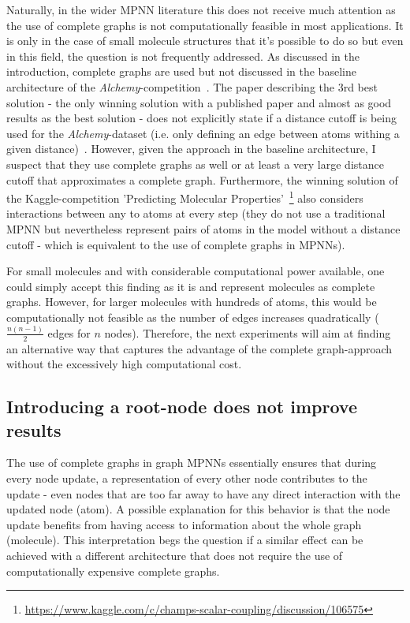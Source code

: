 Naturally, in the wider MPNN literature this does not receive much attention as the use of complete graphs is not computationally feasible in most applications. It is only in the case of small molecule structures that it's possible to do so but even in this field, the question is not frequently addressed. As discussed in the introduction, complete graphs are used but not discussed in the baseline architecture of the \textit{Alchemy}-competition~\cite{Chen2019}. The paper describing the 3rd best solution - the only winning solution with a published paper and almost as good results as the best solution - does not explicitly state if a distance cutoff is being used for the \textit{Alchemy}-dataset (i.e. only defining an edge between atoms withing a given distance)~\cite{Klicpera2019}. However, given the approach in the baseline architecture, I suspect that they use complete graphs as well or at least a very large distance cutoff that approximates a complete graph. Furthermore, the winning solution of the Kaggle-competition 'Predicting Molecular Properties'~\footnote{\url{https://www.kaggle.com/c/champs-scalar-coupling/discussion/106575}} also considers interactions between any to atoms at every step (they do not use a traditional MPNN but nevertheless represent pairs of atoms in the model without a distance cutoff - which is equivalent to the use of complete graphs in MPNNs).

For small molecules and with considerable computational power available, one could simply accept this finding as it is and represent molecules as complete graphs. However, for larger molecules with hundreds of atoms, this would be computationally not feasible as the number of edges increases quadratically ($\frac{n(n - 1)}{2}$ edges for $n$ nodes). Therefore, the next experiments will aim at finding an alternative way that captures the advantage of the complete graph-approach without the excessively high computational cost.





\subsection{Introducing a root-node does not improve results}
\label{sec:root-node}


The use of complete graphs in graph MPNNs essentially ensures that during every node update, a representation of every other node contributes to the update - even nodes that are too far away to have any direct interaction with the updated node (atom).
A possible explanation for this behavior is that the node update benefits from having access to information about the whole graph (molecule). This interpretation begs the question if a similar effect can be achieved with a different architecture that does not require the use of computationally expensive complete graphs.

